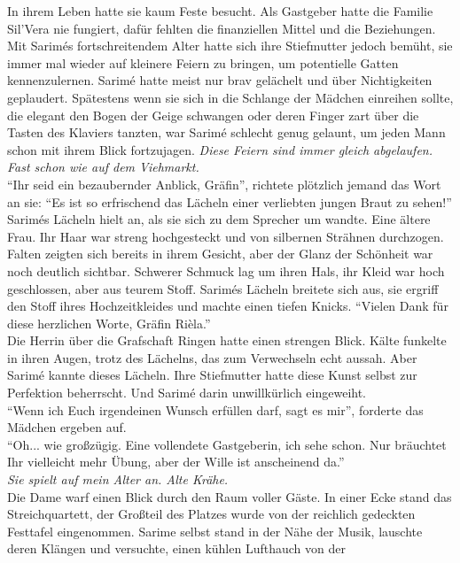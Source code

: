 In ihrem Leben hatte sie kaum Feste besucht. Als Gastgeber hatte die Familie Sil'Vera nie fungiert, 
dafür fehlten die finanziellen Mittel und die Beziehungen. Mit Sarimés fortschreitendem Alter hatte 
sich ihre Stiefmutter jedoch bemüht, sie immer mal wieder auf kleinere Feiern zu bringen, um 
potentielle Gatten kennenzulernen. Sarimé hatte meist nur brav gelächelt und über Nichtigkeiten 
geplaudert. Spätestens wenn sie sich in die Schlange der Mädchen einreihen sollte, die elegant den 
Bogen der Geige schwangen oder deren Finger zart über die Tasten des Klaviers tanzten, war Sarimé 
schlecht genug gelaunt, um jeden Mann schon mit ihrem Blick fortzujagen. \textit{Diese Feiern sind 
immer gleich abgelaufen. Fast schon wie auf dem Viehmarkt.}\\
``Ihr seid ein bezaubernder Anblick, Gräfin'', richtete plötzlich jemand das Wort an sie: ``Es ist 
so erfrischend das Lächeln einer verliebten jungen Braut zu sehen!''\\
Sarimés Lächeln hielt an, als sie sich zu dem Sprecher um wandte. Eine ältere Frau. Ihr Haar war 
streng hochgesteckt und von silbernen Strähnen durchzogen. Falten zeigten sich bereits in ihrem 
Gesicht, aber der Glanz der Schönheit war noch deutlich sichtbar. Schwerer Schmuck lag um ihren 
Hals, ihr Kleid war hoch geschlossen, aber aus teurem Stoff. Sarimés Lächeln breitete sich aus, sie 
ergriff den Stoff ihres Hochzeitkleides und machte einen tiefen Knicks. ``Vielen Dank für diese 
herzlichen Worte, Gräfin Rièla.''\\
Die Herrin über die Grafschaft Ringen hatte einen strengen Blick. Kälte funkelte in ihren Augen, 
trotz des Lächelns, das zum Verwechseln echt aussah. Aber Sarimé kannte dieses Lächeln. Ihre 
Stiefmutter hatte diese Kunst selbst zur Perfektion beherrscht. Und Sarimé darin unwillkürlich 
eingeweiht.\\
``Wenn ich Euch irgendeinen Wunsch erfüllen darf, sagt es mir'', forderte das Mädchen ergeben auf.\\
``Oh... wie großzügig. Eine vollendete Gastgeberin, ich sehe schon. Nur bräuchtet Ihr vielleicht 
mehr Übung, aber der Wille ist anscheinend da.'' \\
\textit{Sie spielt auf mein Alter an. Alte Krähe.}\\
Die Dame warf einen Blick durch den Raum voller Gäste. In einer Ecke stand das Streichquartett, der 
Großteil des Platzes wurde von der reichlich gedeckten Festtafel eingenommen. Sarime selbst stand 
in der Nähe der Musik, lauschte deren Klängen und versuchte, einen kühlen Lufthauch von der 
